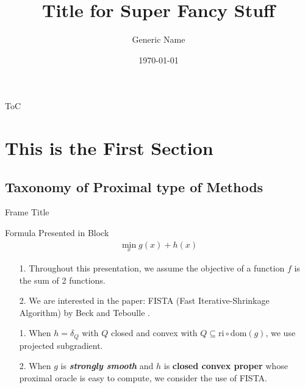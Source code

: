 \documentclass[11pt]{beamer}
\author{Generic Name}
\title{Title for Super Fancy Stuff}
\institute[]{Some Super Fancy Institution}
\date{\today}
\begin{document}
\begin{frame}
    \titlepage
\end{frame}

\begin{frame}{ToC}
    \tableofcontents
\end{frame}

\section{This is the First Section}
    \subsection{Taxonomy of Proximal type of Methods}
        \begin{frame}{Frame Title}
    
            \begin{block}{Formula Presented in Block}
                \begin{align}
                    \min_{x} g(x) + h(x)
                \end{align}    
            \end{block}
            
            \begin{itemize}
                \item [1.]Throughout this presentation, we assume the objective of a function $f$ is the sum of 2 functions.
                \item [2.]We are interested in the paper: FISTA (Fast Iterative-Shrinkage Algorithm) by Beck and Teboulle \cite{paper:FISTA}. 
                \pause 
                \item [1.] When $h = \delta_Q$ with $Q$ closed and convex with $Q\subseteq \text{ri}\circ \text{dom}(g)$, we use projected subgradient. 
                \item [2.] When $g$ is \textbf{\emph{strongly smooth}} and $h$ is \textbf{closed convex proper} whose proximal oracle is easy to compute, we consider the use of FISTA. 
            \end{itemize}
                
        \end{frame}
        
\end{document}

